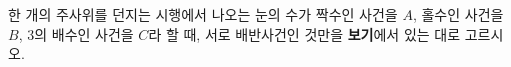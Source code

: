 한 개의 주사위를 던지는 시행에서 나오는 눈의 수가 짝수인 사건을 $A$, 홀수인 사건을 $B$, $3$의 배수인 사건을 $C$라 할 때, 서로 배반사건인 것만을 \textbf{보기}에서 있는 대로 고르시오. 
